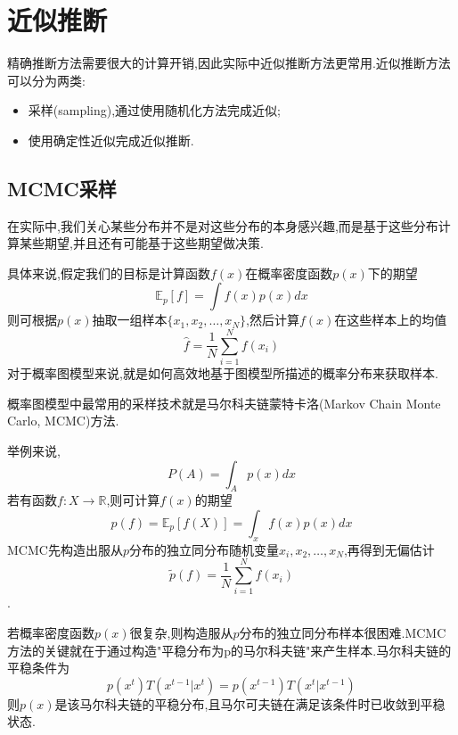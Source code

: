 \section{近似推断}

精确推断方法需要很大的计算开销,因此实际中近似推断方法更常用.近似推断方法可以分为两类:
\begin{itemize}
\item 采样(sampling),通过使用随机化方法完成近似;
\item 使用确定性近似完成近似推断.
\end{itemize}

\subsection{MCMC采样}

在实际中,我们关心某些分布并不是对这些分布的本身感兴趣,而是基于这些分布计算某些期望,并且还有可能基于这些期望做决策.

具体来说,假定我们的目标是计算函数$f(x)$在概率密度函数$p(x)$下的期望
\begin{equation}
\mathbb E_p[f]=\int f(x)p(x)dx
\end{equation}
则可根据$p(x)$抽取一组样本$\{x_1,x_2,\dots,x_N\}$,然后计算$f(x)$在这些样本上的均值
\begin{equation}
\hat f=\frac{1}{N}\sum_{i=1}^Nf(x_i)
\end{equation}
对于概率图模型来说,就是如何高效地基于图模型所描述的概率分布来获取样本.

概率图模型中最常用的采样技术就是马尔科夫链蒙特卡洛(Markov Chain Monte Carlo, MCMC)方法.

举例来说,
\begin{equation}
P(A)=\int_Ap(x)dx
\end{equation}
若有函数$f:X\rightarrow\mathbb R$,则可计算$f(x)$的期望
\begin{equation}
p(f)=\mathbb E_p[f(X)]=\int_xf(x)p(x)dx
\end{equation}
MCMC先构造出服从$p$分布的独立同分布随机变量$x_i,x_2,\dots,x_N$,再得到无偏估计
\begin{equation}
\tilde p(f)=\frac{1}{N}\sum_{i=1}^Nf(x_i)
\end{equation}
.

若概率密度函数$p(x)$很复杂,则构造服从$p$分布的独立同分布样本很困难.MCMC方法的关键就在于通过构造"平稳分布为p的马尔科夫链"来产生样本.马尔科夫链的平稳条件为
\begin{equation}
p(x^t)T(x^{t-1}|x^t)=p(x^{t-1})T(x^t|x^{t-1})
\end{equation}
则$p(x)$是该马尔科夫链的平稳分布,且马尔可夫链在满足该条件时已收敛到平稳状态.

